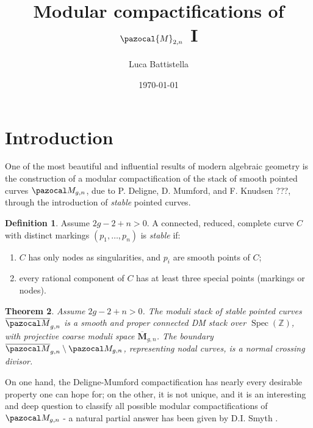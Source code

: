 \documentclass[11pt]{amsart}
\title{Modular compactifications of $\pazocal{M}_{2,n}$ I}
\author{Luca Battistella}
\date{\today}
\newcommand{\oM}{\overline{\pazocal M}}
\theoremstyle{plain}
\newtheorem{thm}{Theorem}[section]
\theoremstyle{definition}
\newtheorem{dfn}[thm]{Definition}
\begin{document}
\begin{abstract}


\end{abstract}

\maketitle
\tableofcontents

\section{Introduction}
One of the most beautiful and influential results of modern algebraic geometry is the construction of a modular compactification of the stack of smooth pointed curves $\pazocal M_{g,n}$, due to P. Deligne, D. Mumford, and F. Knudsen \cite{DM}???, through the introduction of \emph{stable} pointed curves.

\begin{dfn}
 Assume $2g-2+n>0$. A connected, reduced, complete curve $C$ with distinct markings $(p_1,\ldots,p_n)$ is \emph{stable} if:
 \begin{enumerate}
  \item $C$ has only nodes as singularities, and $p_i$ are smooth points of $C$;
  \item every rational component of $C$ has at least three special points (markings or nodes).
 \end{enumerate}
\end{dfn}

\begin{thm}
 Assume $2g-2+n>0$. The moduli stack of stable pointed curves $\oM_{g,n}$ is a smooth and proper connected DM stack over $\operatorname{Spec}(\mathbb Z)$, with projective coarse moduli space $\overline{\mathbf M}_{g,n}$. The boundary $\oM_{g,n}\setminus\pazocal M_{g,n}$, representing nodal curves, is a normal crossing divisor.
\end{thm}
On one hand, the Deligne-Mumford compactification has nearly every desirable property one can hope for; on the other, it is not unique, and it is an interesting and deep question to classify all possible modular compactifications of $\pazocal M_{g,n}$ - a natural partial answer has been given by D.I. Smyth \cite{SMY-towards}.
\end{document}
